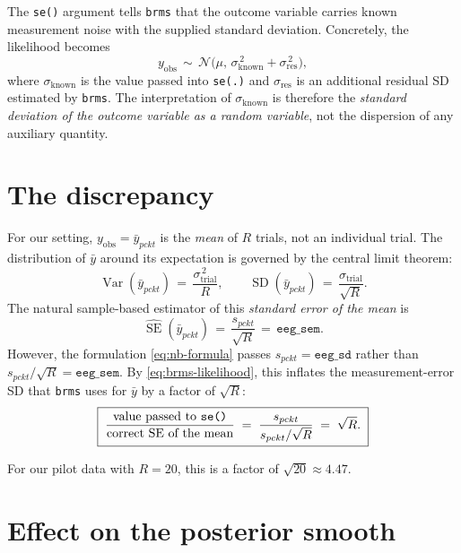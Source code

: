 \documentclass[11pt]{article}
\begin{document}
The \texttt{se()} argument tells \texttt{brms} that the outcome
variable carries known measurement noise with the supplied
standard deviation. Concretely, the likelihood becomes
\begin{equation}
y_{\text{obs}} \,\sim\, \mathcal{N}\!\bigl(\mu,\,
\sigma_{\text{known}}^{\,2} + \sigma_{\text{res}}^{\,2}\bigr),
\label{eq:brms-likelihood}
\end{equation}
where $\sigma_{\text{known}}$ is the value passed into
\texttt{se(.)} and $\sigma_{\text{res}}$ is an additional residual
SD estimated by \texttt{brms}. The interpretation of
$\sigma_{\text{known}}$ is therefore the \emph{standard deviation
of the outcome variable as a random variable}, not the dispersion
of any auxiliary quantity.

\section{The discrepancy}

For our setting, $y_{\text{obs}} = \bar y_{pck t}$ is the
\emph{mean} of $R$ trials, not an individual trial. The
distribution of $\bar y$ around its expectation is governed by
the central limit theorem:
\begin{equation}
\operatorname{Var}(\bar y_{pck t}) \,=\, \frac{\sigma_{\text{trial}}^{\,2}}{R},
\qquad
\operatorname{SD}(\bar y_{pck t}) \,=\, \frac{\sigma_{\text{trial}}}{\sqrt{R}}.
\label{eq:clt}
\end{equation}
The natural sample-based estimator of this
\emph{standard error of the mean} is
\begin{equation}
\widehat{\operatorname{SE}}(\bar y_{pck t})
   \,=\, \frac{s_{pck t}}{\sqrt{R}}
   \,=\, \texttt{eeg\_sem}.
\end{equation}
However, the formulation \eqref{eq:nb-formula} passes
$s_{pck t} = \texttt{eeg\_sd}$ rather than
$s_{pck t}/\sqrt{R} = \texttt{eeg\_sem}$. By
\eqref{eq:brms-likelihood}, this inflates the measurement-error
SD that \texttt{brms} uses for $\bar y$ by a factor of $\sqrt{R}$:
\begin{equation}
\boxed{\;
\frac{\text{value passed to \texttt{se()}}}
     {\text{correct SE of the mean}}
\;=\;
\frac{s_{pck t}}{s_{pck t}/\sqrt{R}}
\;=\;\sqrt{R}.\;}
\end{equation}

For our pilot data with $R=20$, this is a factor of
$\sqrt{20}\approx 4.47$.

\section{Effect on the posterior smooth}
\end{document}
